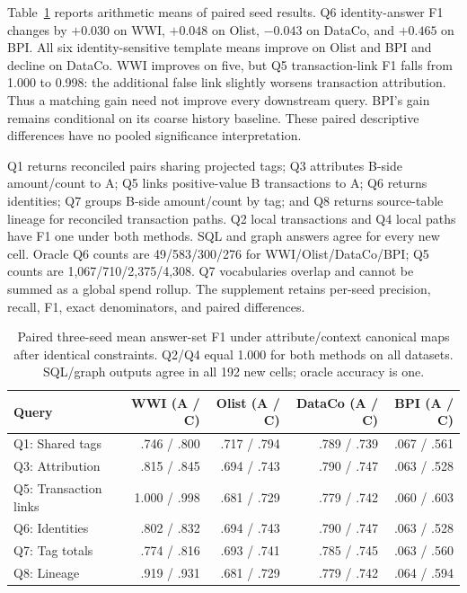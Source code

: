 \documentclass[conference,letterpaper]{IEEEtran}
\begin{document}
Table~\ref{tab:queries} reports arithmetic means of paired seed results. Q6 identity-answer F1 changes by $+0.030$ on WWI, $+0.048$ on Olist, $-0.043$ on DataCo, and $+0.465$ on BPI. All six identity-sensitive template means improve on Olist and BPI and decline on DataCo. WWI improves on five, but Q5 transaction-link F1 falls from 1.000 to 0.998: the additional false link slightly worsens transaction attribution. Thus a matching gain need not improve every downstream query. BPI's gain remains conditional on its coarse history baseline. These paired descriptive differences have no pooled significance interpretation.

Q1 returns reconciled pairs sharing projected tags; Q3 attributes B-side amount/count to A; Q5 links positive-value B transactions to A; Q6 returns identities; Q7 groups B-side amount/count by tag; and Q8 returns source-table lineage for reconciled transaction paths. Q2 local transactions and Q4 local paths have F1 one under both methods. SQL and graph answers agree for every new cell. Oracle Q6 counts are 49/583/300/276 for WWI/Olist/DataCo/BPI; Q5 counts are 1,067/710/2,375/4,308. Q7 vocabularies overlap and cannot be summed as a global spend rollup. The supplement retains per-seed precision, recall, F1, exact denominators, and paired differences.


\begin{table}[t]
\caption{Paired three-seed mean answer-set F1 under attribute/context canonical maps after identical constraints. Q2/Q4 equal 1.000 for both methods on all datasets. SQL/graph outputs agree in all 192 new cells; oracle accuracy is one.}
\label{tab:queries}
\centering\small
\begin{tabular}{lrrrr}
\toprule
Query & WWI (A / C) & Olist (A / C) & DataCo (A / C) & BPI (A / C)\\
\midrule
Q1: Shared tags & .746 / .800 & .717 / .794 & .789 / .739 & .067 / .561\\
Q3: Attribution & .815 / .845 & .694 / .743 & .790 / .747 & .063 / .528\\
Q5: Transaction links & 1.000 / .998 & .681 / .729 & .779 / .742 & .060 / .603\\
Q6: Identities & .802 / .832 & .694 / .743 & .790 / .747 & .063 / .528\\
Q7: Tag totals & .774 / .816 & .693 / .741 & .785 / .745 & .063 / .560\\
Q8: Lineage & .919 / .931 & .681 / .729 & .779 / .742 & .064 / .594\\
\bottomrule
\end{tabular}
\end{table}
\end{document}
